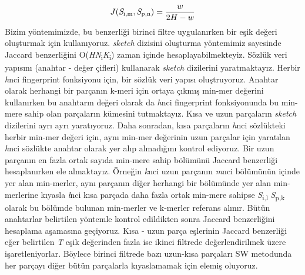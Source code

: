 \begin{equation}
J(\textit{S}\textsubscript{i,m}, \textit{S}\textsubscript{p,n}) = \dfrac{w}{2H - w}
\end{equation}
Bizim yöntemimizde, bu benzerliği birinci filtre uygulanırken bir eşik değeri oluşturmak için kullanıyoruz. \textit{sketch} dizisini oluşturma yöntemimiz sayesinde Jaccard benzerliğini O(\textit{H}\textit{N}\textsubscript{i}\textbar\textit{K}\textsubscript{i}) zaman içinde hesaplayabilmekteyiz. Sözlük veri yapısını (anahtar - değer çifleri) kullanarak \textit{sketch} dizilerini yaratmaktayız. Herbir \textit{h}nci fingerprint fonksiyonu için, bir sözlük veri yapısı oluştruyoruz. Anahtar olarak herhangi bir parçanın k-meri için ortaya çıkmış min-mer değerini kullanırken bu anahtarın değeri olarak da \textit{h}nci fingerprint fonksiyonunda bu min-mere sahip olan parçaların kümesini tutmaktayız. Kısa ve uzun parçaların \textit{sketch} dizilerini ayrı ayrı yaratıyoruz. Daha sonradan, kısa parçaların \textit{h}nci sözlükteki herbir min-mer değeri için, aynı min-mer değerinin uzun parçalar için yaratılan \textit{h}nci sözlükte anahtar olarak yer alıp almadığını kontrol ediyoruz. Bir uzun parçanın en fazla ortak sayıda min-mere sahip bölümünü Jaccard benzerliği hesaplanırken ele almaktayız. Örneğin \textit{k}nci uzun parçanın \textit{m}nci bölümünün içinde yer alan min-merler, aynı parçanın diğer herhangi bir bölümünde yer alan min-merlerine kıyasla \textit{l}nci kısa parçada daha fazla ortak min-mere sahipse \textit{S}\textsubscript{i,l} \textit{S}\textsubscript{p,k} olarak bu bölümde bulunan min-merler ve k-merler referans alınır. Bütün anahtarlar belirtilen yöntemle kontrol edildikten sonra Jaccard benzerliğini hesaplama aşamasına geçiyoruz. Kısa - uzun parça eşlerinin Jaccard benzerliği eğer belirtilen \textit{T} eşik değerinden fazla ise ikinci filtrede değerlendirilmek üzere işaretleniyorlar. Böylece birinci filtrede bazı uzun-kısa parçaları SW metodunda her parçayı diğer bütün parçalarla kıyaslamamak için elemiş oluyoruz.
